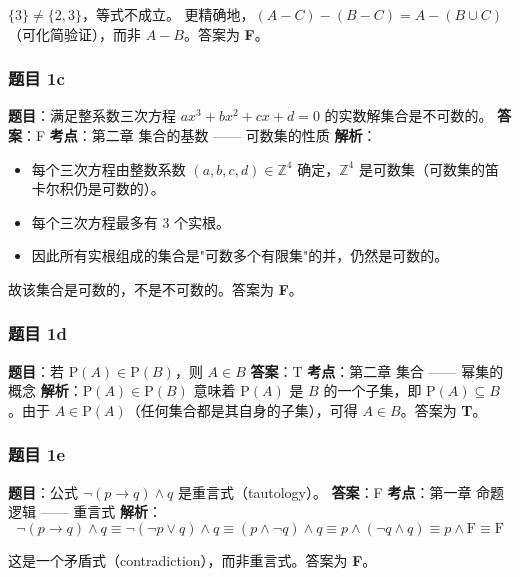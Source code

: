 \documentclass[10pt,a4paper,openany]{ctexbook}
\theoremstyle{definition}
\theoremstyle{remark}
\begin{document}
$\{3\} \neq \{2, 3\}$，等式不成立。
更精确地，$(A - C) - (B - C) = A - (B \cup C)$（可化简验证），而非 $A - B$。答案为 \textbf{F}。
\vspace{-2pt}

\subsubsection{题目 1c}

\textbf{题目}：满足整系数三次方程 $ax^3 + bx^2 + cx + d = 0$ 的实数解集合是不可数的。
\textbf{答案}：F
\textbf{考点}：第二章 集合的基数 —— 可数集的性质
\textbf{解析}：
\begin{itemize}
\item 每个三次方程由整数系数 $(a, b, c, d) \in \mathbb{Z}^4$ 确定，$\mathbb{Z}^4$ 是可数集（可数集的笛卡尔积仍是可数的）。
\item 每个三次方程最多有 3 个实根。
\item 因此所有实根组成的集合是"可数多个有限集"的并，仍然是可数的。

\end{itemize}

故该集合是可数的，不是不可数的。答案为 \textbf{F}。
\vspace{-2pt}

\subsubsection{题目 1d}

\textbf{题目}：若 $\mathrm{P}(A) \in \mathrm{P}(B)$，则 $A \in B$
\textbf{答案}：T
\textbf{考点}：第二章 集合 —— 幂集的概念
\textbf{解析}：$\mathrm{P}(A) \in \mathrm{P}(B)$ 意味着 $\mathrm{P}(A)$ 是 $B$ 的一个子集，即 $\mathrm{P}(A) \subseteq B$。由于 $A \in \mathrm{P}(A)$（任何集合都是其自身的子集），可得 $A \in B$。答案为 \textbf{T}。
\vspace{-2pt}

\subsubsection{题目 1e}

\textbf{题目}：公式 $\neg(p \to q) \land q$ 是重言式（tautology）。
\textbf{答案}：F
\textbf{考点}：第一章 命题逻辑 —— 重言式
\textbf{解析}：
\[
\neg(p \to q) \land q \equiv \neg(\neg p \lor q) \land q \equiv (p \land \neg q) \land q \equiv p \land (\neg q \land q) \equiv p \land \mathrm{F} \equiv \mathrm{F}
\]

这是一个矛盾式（contradiction），而非重言式。答案为 \textbf{F}。
\vspace{-2pt}
\end{document}
